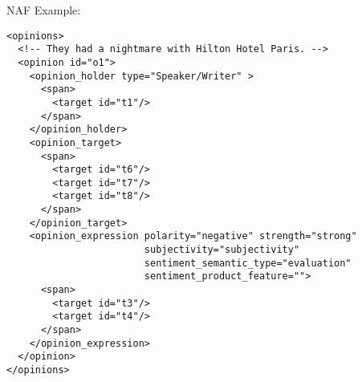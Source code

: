 


NAF Example:

\begin{Verbatim}[fontsize=\small]
<opinions>
  <!-- They had a nightmare with Hilton Hotel Paris. -->
  <opinion id="o1">
    <opinion_holder type="Speaker/Writer" >
      <span>
        <target id="t1"/>
      </span>
    </opinion_holder>
    <opinion_target>
      <span>
        <target id="t6"/>
        <target id="t7"/>
        <target id="t8"/>
      </span>
    </opinion_target>
    <opinion_expression polarity="negative" strength="strong" 
                        subjectivity="subjectivity"
                        sentiment_semantic_type="evaluation"
                        sentiment_product_feature="">
      <span>
        <target id="t3"/>
        <target id="t4"/>
      </span>
    </opinion_expression>
  </opinion>
</opinions>
\end{Verbatim}


